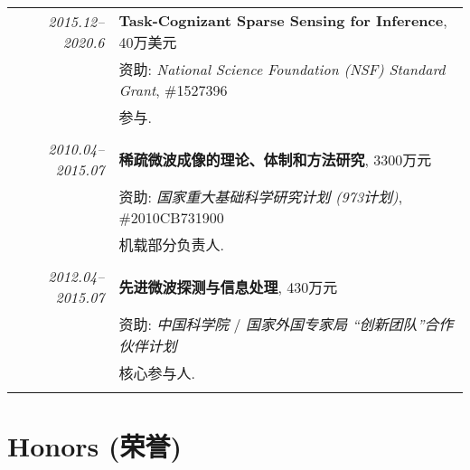 \documentclass[paper=a4,fontsize=11pt]{scrartcl}
\begin{document}
\begin{longtable}{r|p{12cm}}
	\emph{2015.12--2020.6} & \textbf{Task-Cognizant Sparse Sensing for Inference}, 40万美元 \\
	& 资助: \emph{National Science Foundation (NSF) Standard Grant}, \#1527396\\
	& 参与.\\
	\multicolumn{2}{c}{} \\
	
	
	
	\emph{2010.04--2015.07} & \textbf{稀疏微波成像的理论、体制和方法研究}, 3300万元 \\
	& 资助: \emph{国家重大基础科学研究计划 (973计划)}, \#2010CB731900\\
	& 机载部分负责人.\\
	\multicolumn{2}{c}{} \\
	
	\emph{2012.04--2015.07} & \textbf{先进微波探测与信息处理}, 430万元 \\
	& 资助: \emph{中国科学院} / \emph{国家外国专家局 ``创新团队''合作伙伴计划}\\
	& 核心参与人.\\
	\multicolumn{2}{c}{} 
	
\end{longtable}

\section*{Honors (荣誉)}
\end{document}
